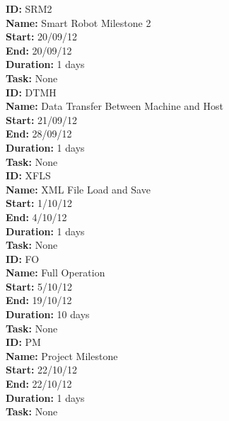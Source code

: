 \documentclass[11pt, a4paper]{report}
\begin{document}
\noindent \textbf{ID:} SRM2 \\
\noindent \textbf{Name:} Smart Robot Milestone 2 \\
\noindent \textbf{Start:} 20/09/12 \\
\noindent \textbf{End:} 20/09/12 \\
\noindent \textbf{Duration:} 1 days \\
\noindent \textbf{Task:} None\\[0.5cm]

\noindent \textbf{ID:} DTMH \\
\noindent \textbf{Name:} Data Transfer Between Machine and Host \\
\noindent \textbf{Start:} 21/09/12 \\
\noindent \textbf{End:} 28/09/12 \\
\noindent \textbf{Duration:} 1 days \\
\noindent \textbf{Task:} None\\[0.5cm]

\noindent \textbf{ID:} XFLS \\
\noindent \textbf{Name:} XML File Load and Save \\
\noindent \textbf{Start:} 1/10/12 \\
\noindent \textbf{End:} 4/10/12 \\
\noindent \textbf{Duration:} 1 days \\
\noindent \textbf{Task:} None\\[0.5cm]

\noindent \textbf{ID:} FO \\
\noindent \textbf{Name:} Full Operation \\
\noindent \textbf{Start:} 5/10/12 \\
\noindent \textbf{End:} 19/10/12 \\
\noindent \textbf{Duration:} 10 days \\
\noindent \textbf{Task:} None\\[0.5cm]

\noindent \textbf{ID:} PM \\
\noindent \textbf{Name:} Project Milestone \\
\noindent \textbf{Start:} 22/10/12 \\
\noindent \textbf{End:} 22/10/12 \\
\noindent \textbf{Duration:} 1 days \\
\noindent \textbf{Task:} None\\[0.5cm]
\end{document}
